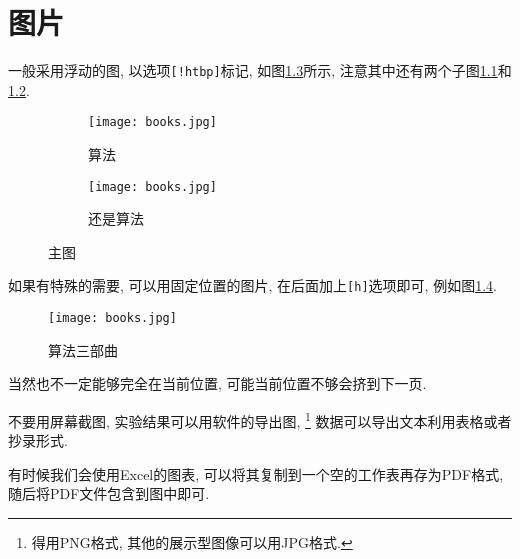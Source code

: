 \chapter{图片}

  一般采用浮动的图, 以选项\texttt{[!htbp]}标记, 如图\ref{fig:algorithm}所示,
注意其中还有两个子图\ref{fig:algorithm:a}和\ref{fig:algorithm:b}.

\begin{figure}[!htbp]
\centering
\begin{subfigure}[t]{.3\textwidth}
  \centering
  \texttt{[image: books.jpg]}
  \caption{算法}
  \label{fig:algorithm:a}
\end{subfigure}
\quad
\begin{subfigure}[t]{.3\textwidth}
  \centering
  \texttt{[image: books.jpg]}
  \caption{还是算法}
  \label{fig:algorithm:b}
\end{subfigure}
\caption{主图}
\label{fig:algorithm}
\end{figure}


  如果有特殊的需要, 可以用固定位置的图片, 在后面加上\texttt{[h]}选项即可, 例如图\ref{fig:books}.

\begin{figure}[h]
    \centering
    \texttt{[image: books.jpg]}
    \caption{算法三部曲}
    \label{fig:books}
\end{figure}

  当然也不一定能够完全在当前位置, 可能当前位置不够会挤到下一页.

  不要用屏幕截图, 实验结果可以用软件的导出图,%
\footnote{得用PNG格式, 其他的展示型图像可以用JPG格式.}
数据可以导出文本利用表格或者抄录形式.

  有时候我们会使用Excel的图表, 可以将其复制到一个空的工作表再存为PDF格式,
随后将PDF文件包含到图中即可.
